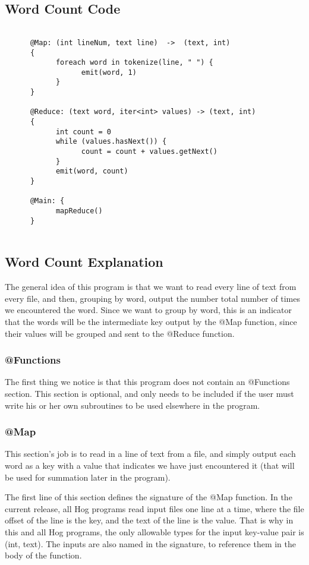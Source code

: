 \documentclass{article}
\begin{document}
\subsection*{Word Count Code}
\begin{verbatim}
      
      @Map: (int lineNum, text line)  ->  (text, int)
      {
            foreach word in tokenize(line, " ") {
                  emit(word, 1)
            }
      }
      
      @Reduce: (text word, iter<int> values) -> (text, int)
      {
            int count = 0
            while (values.hasNext()) {
                  count = count + values.getNext()
            }
            emit(word, count)
      }
      
      @Main: {
            mapReduce()
      }
      
\end{verbatim}

\subsection*{Word Count Explanation}
The general idea of this program is that we want to read every line of text from every file, and then, grouping by word, output the number total number of times we encountered the word. Since we want to group by word, this is an indicator that the words will be the intermediate key output by the @Map function, since their values will be grouped and sent to the @Reduce function.
\subsubsection*{@Functions}
The first thing we notice is that this program does not contain an @Functions section. This section is optional, and only needs to be included if the user must write his or her own subroutines to be used elsewhere in the program.

\subsubsection*{@Map}
This section's job is to read in a line of text from a file, and simply output each word as a key with a value that indicates we have just encountered it (that will be used for summation later in the program).

The first line of this section defines the signature of the @Map function. In the current release, all Hog programs read input files one line at a time, where the file offset of the line is the key, and the text of the line is the value. That is why in this and all Hog programs, the only allowable types for the input key-value pair is (int, text). The inputs are also named in the signature, to reference them in the body of the function.
\end{document}
